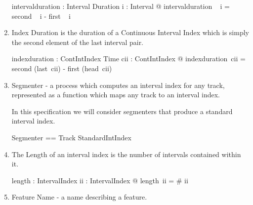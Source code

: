 \documentclass[11pt]{article}
\begin{document}
\begin{enumerate}
\begin{axdef}
	intervalduration : Interval \fun Duration 
\where
	\forall i : Interval @ intervalduration ~ i = second ~ i - first ~ i 
\end{axdef}


\item \textsf{Index Duration} is the duration of a Continuous Interval Index which is simply the second element of the last interval pair. 

\begin{axdef}
	indexduration : ContIntIndex \fun Time 
\where
\forall cii : ContIntIndex @ indexduration~cii = second (last~cii) - first (head~cii)
\end{axdef} 

\item \textsf{Segmenter} - a process which computes an interval index  for any track, represented as a function which maps any track to an interval index.

\begin{flushright}
  \begin{tikzpicture}
    
    
  \end{tikzpicture}
\end{flushright}


In this specification we will consider segmenters that produce a standard interval index. 

\begin{zed}
	Segmenter == Track \fun StandardIntIndex  \\
\end{zed}

\item The \textsf{Length} of an interval index is the number of intervals contained within it. 

\begin{axdef}
	length : IntervalIndex \fun \nat 
\where
	\forall ii : IntervalIndex @ length~ii = \# ii
\end{axdef}


\item \textsf{Feature Name} - a name describing a feature.

\begin{zed}
	[FeatureName]
\end{zed}


\end{enumerate}
\end{document}

